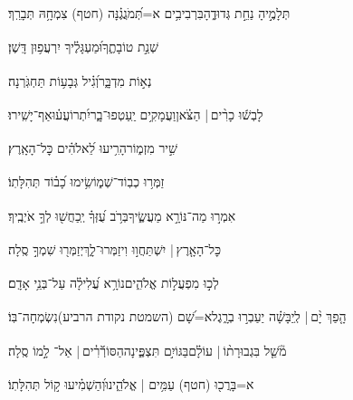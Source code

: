 \documentclass[12pt]{article}
\newcommand{\loc}[1]{\textsuperscript{\locf{#1}}}
\begin{document}
{\loc{ יא}~}‏תְּלָמֶ֣יהָ  נַחֵ֣ת גְּדוּדֶ֑הָ{\hfill}בִּרְבִיבִ֥ים א=תְּ֝מֹגֲגֶ֗נָּה (חטף) צִמְחָ֥הּ תְּבָרֵֽךְ׃\par

{\loc{ יב}~}‏ שְׁנַ֣ת טוֹבָתֶ֑ךָ{\hfill}וּ֝מַעְגָּלֶ֗יךָ יִרְעֲפ֥וּן דָּֽשֶׁן׃\par

{\loc{ יג}~}‏ נְא֣וֹת מִדְבָּ֑ר{\hfill}וְ֝גִ֗יל גְּבָע֥וֹת תַּחְגֹּֽרְנָה׃\par

{\loc{ יד}~}‏לָבְשׁ֬וּ כָרִ֨ים |  הַצֹּ֗אן{\hfill}וַעֲמָקִ֥ים יַֽעַטְפוּ־בָ֑ר\newline\hspace*{.5em}יִ֝תְרוֹעֲע֗וּ{\hfill}אַף־יָשִֽׁירוּ׃\par\pend
\ledpb
\pstart[\subsection*{\textcolor{red}{פרק סו}}]\label{פרק סו}
{\loc{ א}~}‏ שִׁ֣יר מִזְמ֑וֹר{\hfill}הָרִ֥יעוּ לֵ֝אלֹהִ֗ים כׇּל־הָאָֽרֶץ׃\par

{\loc{ ב}~}‏זַמְּר֥וּ כְבֽוֹד־שְׁמ֑וֹ{\hfill}שִׂ֥ימוּ כָ֝ב֗וֹד תְּהִלָּתֽוֹ׃\par

{\loc{ ג}~}‏אִמְר֣וּ  מַה־נּוֹרָ֣א מַעֲשֶׂ֑יךָ{\hfill}בְּרֹ֥ב עֻ֝זְּךָ֗ יְֽכַחֲשׁ֖וּ לְךָ֣ אֹיְבֶֽיךָ׃\par

{\loc{ ד}~}‏כׇּל־הָאָ֤רֶץ |  יִשְׁתַּחֲו֣וּ  וִיזַמְּרוּ־לָ֑ךְ{\hfill}יְזַמְּר֖וּ שִׁמְךָ֣ סֶֽלָה׃\par

{\loc{ ה}~}‏לְכ֣וּ  מִפְעֲל֣וֹת אֱלֹהִ֑ים{\hfill}נוֹרָ֥א עֲ֝לִילָ֗ה עַל־בְּנֵ֥י אָדָֽם׃\par

{\loc{ ו}~}‏הָ֤פַךְ יָ֨ם |  לְֽיַבָּשָׁ֗ה{\hfill} יַעַבְר֣וּ בְרָ֑גֶל\newline\hspace*{.5em}א=שָׁ֝ם (השמטת נקודת הרביע){\hfill}נִשְׂמְחָה־בּֽוֹ׃\par

{\loc{ ז}~}‏מֹ֘שֵׁ֤ל בִּגְבוּרָת֨וֹ |  עוֹלָ֗ם{\hfill}\newline\hspace*{.5em}בַּגּוֹיִ֣ם תִּצְפֶּ֑ינָה{\hfill}הַסּוֹרְﬞרִ֓ים | \hspace{1em}אַל־ לָ֣מוֹ סֶֽלָה׃\par

{\loc{ ח}~}‏א=בָּרֲכ֖וּ (חטף) עַמִּ֥ים | אֱלֹהֵ֑ינוּ{\hfill}וְ֝הַשְׁמִ֗יעוּ ק֣וֹל תְּהִלָּתֽוֹ׃\par
\end{document}

